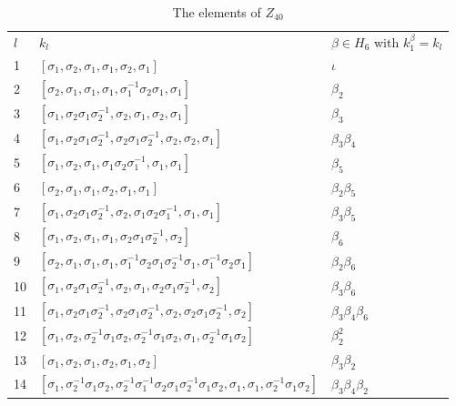 \documentclass[12pt,a4paper]{article}
\numberwithin{equation}{section}
\numberwithin{table}{section}
\begin{document}
%
\begin{table}[H]
\centering
\footnotesize
\captionsetup{font=footnotesize}
\caption{The elements of $Z_{40}$}
\label{tab:ElementsZ40List}
\begin{tabular}{lll}
\hline\noalign{\smallskip}
$l$        & $k_l$ & $\beta \in H_6$ with $k_1^{\beta} = k_l$ \\
\noalign{\smallskip}\hline\noalign{\smallskip}
1&$[\sigma_1,\sigma_2,\sigma_1,\sigma_1,\sigma_2,\sigma_1]$&$\iota$\\
2&$[\sigma_2,\sigma_1,\sigma_1,\sigma_1,\sigma_1^{-1}\sigma_2\sigma_1,\sigma_1]$&$\beta_2$\\
3&$[\sigma_1,\sigma_2\sigma_1\sigma_2^{-1},\sigma_2,\sigma_1,\sigma_2,\sigma_1]$&$\beta_3$\\
4&$[\sigma_1,\sigma_2\sigma_1\sigma_2^{-1},\sigma_2\sigma_1\sigma_2^{-1},\sigma_2,\sigma_2,\sigma_1]$&$\beta_3\beta_4$\\
5&$[\sigma_1,\sigma_2,\sigma_1,\sigma_1\sigma_2\sigma_1^{-1},\sigma_1,\sigma_1]$&$\beta_5$\\
6&$[\sigma_2,\sigma_1,\sigma_1,\sigma_2,\sigma_1,\sigma_1]$&$\beta_2\beta_5$\\
7&$[\sigma_1,\sigma_2\sigma_1\sigma_2^{-1},\sigma_2,\sigma_1\sigma_2\sigma_1^{-1},\sigma_1,\sigma_1]$&$\beta_3\beta_5$\\
8&$[\sigma_1,\sigma_2,\sigma_1,\sigma_1,\sigma_2\sigma_1\sigma_2^{-1},\sigma_2]$&$\beta_6$\\
9&$[\sigma_2,\sigma_1,\sigma_1,\sigma_1,\sigma_1^{-1}\sigma_2\sigma_1\sigma_2^{-1}\sigma_1,\sigma_1^{-1}\sigma_2\sigma_1]$
&$\beta_2\beta_6$\\
10&$[\sigma_1,\sigma_2\sigma_1\sigma_2^{-1},\sigma_2,\sigma_1,\sigma_2\sigma_1\sigma_2^{-1},\sigma_2]$&$\beta_3\beta_6$\\
\noalign{\smallskip}\hline\noalign{\smallskip}
11&$[\sigma_1,\sigma_2\sigma_1\sigma_2^{-1},\sigma_2\sigma_1\sigma_2^{-1},\sigma_2,\sigma_2\sigma_1\sigma_2^{-1},\sigma_2]$
&$\beta_3\beta_4\beta_6$\\
12&$[\sigma_1,\sigma_2,\sigma_2^{-1}\sigma_1\sigma_2,\sigma_2^{-1}\sigma_1\sigma_2,\sigma_1,\sigma_2^{-1}\sigma_1\sigma_2]$
&$\beta_2^{2}$\\
13&$[\sigma_1,\sigma_2,\sigma_1,\sigma_2,\sigma_1,\sigma_2]$&$\beta_3\beta_2$\\
14&$[\sigma_1,\sigma_2^{-1}\sigma_1\sigma_2,\sigma_2^{-1}\sigma_1^{-1}\sigma_2\sigma_1\sigma_2^{-1}\sigma_1\sigma_2,
\sigma_1,\sigma_1,\sigma_2^{-1}\sigma_1\sigma_2]$&$\beta_3\beta_4\beta_2$\\

\end{tabular}
\end{table}
\end{document}
